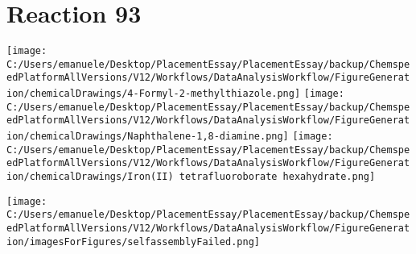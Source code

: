 \documentclass{article}%
\begin{document}
\section*{Reaction 93}%
%
\begin{scheme}[H]%
\begin{minipage}{0.5\textwidth}%
\texttt{[image: C:/Users/emanuele/Desktop/PlacementEssay/PlacementEssay/backup/ChemspeedPlatformAllVersions/V12/Workflows/DataAnalysisWorkflow/FigureGeneration/chemicalDrawings/4-Formyl-2-methylthiazole.png]}%
\texttt{[image: C:/Users/emanuele/Desktop/PlacementEssay/PlacementEssay/backup/ChemspeedPlatformAllVersions/V12/Workflows/DataAnalysisWorkflow/FigureGeneration/chemicalDrawings/Naphthalene-1,8-diamine.png]}%
\texttt{[image: C:/Users/emanuele/Desktop/PlacementEssay/PlacementEssay/backup/ChemspeedPlatformAllVersions/V12/Workflows/DataAnalysisWorkflow/FigureGeneration/chemicalDrawings/Iron(II) tetrafluoroborate hexahydrate.png]}%
\end{minipage}%
\begin{minipage}{0.5\textwidth}%
\begin{center}%
\texttt{[image: C:/Users/emanuele/Desktop/PlacementEssay/PlacementEssay/backup/ChemspeedPlatformAllVersions/V12/Workflows/DataAnalysisWorkflow/FigureGeneration/imagesForFigures/selfassemblyFailed.png]}%
\end{center}%
\end{minipage}%
\caption{Self-assembly of components 1, 21, with Iron(II) in a 3.0:1.5:1.0 molar ratio in CH$_3$CN at 60\textdegree C for 40h. These are the reagents (starting materials) for reaction 93.}%
\end{scheme}%
\end{document}
